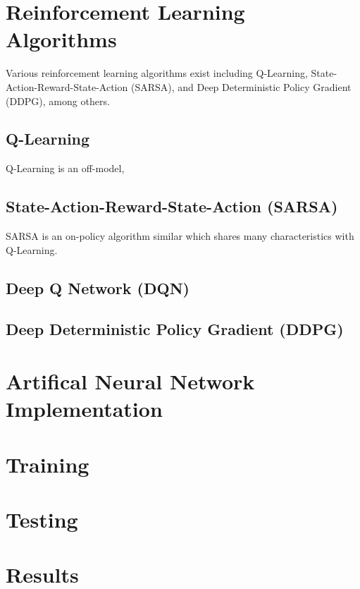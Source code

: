 \section{Reinforcement Learning Algorithms}
Various reinforcement learning algorithms exist including Q-Learning, State-Action-Reward-State-Action (SARSA), and Deep Deterministic Policy Gradient (DDPG), among others.

\subsection{Q-Learning}
Q-Learning is an off-model, 

\subsection{State-Action-Reward-State-Action (SARSA)}
SARSA is an on-policy algorithm similar which shares many characteristics with Q-Learning.

\subsection{Deep Q Network (DQN)}


\subsection{Deep Deterministic Policy Gradient (DDPG)}





\section{Artifical Neural Network Implementation}

\section{Training}

\section{Testing}

\section{Results}

